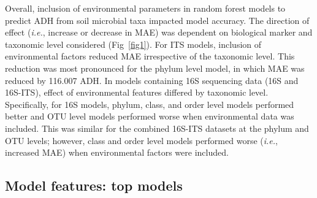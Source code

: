 \documentclass[
  10pt,
  letterpaper,
]{article}
\begin{document}
Overall, inclusion of environmental parameters in random forest models
to predict ADH from soil microbial taxa impacted model accuracy. The
direction of effect (\emph{i.e.}, increase or decrease in MAE) was
dependent on biological marker and taxonomic level considered
(Fig~\ref{fig1}). For ITS models, inclusion of environmental factors
reduced MAE irrespective of the taxonomic level. This reduction was most
pronounced for the phylum level model, in which MAE was reduced by
116.007 ADH. In models containing 16S sequencing data (16S and 16S-ITS),
effect of environmental features differed by taxonomic level.
Specifically, for 16S models, phylum, class, and order level models
performed better and OTU level models performed worse when environmental
data was included. This was similar for the combined 16S-ITS datasets at
the phylum and OTU levels; however, class and order level models
performed worse (\emph{i.e.}, increased MAE) when environmental factors
were included.

\hypertarget{model-features-top-models}{%
\subsection{Model features: top
models}\label{model-features-top-models}}
\end{document}
